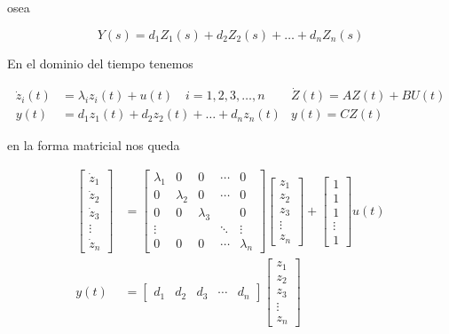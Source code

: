 \documentclass[legalpaper,twocolumn]{article}
\begin{document}
osea

\[Y(s) = d_1 Z_1(s) + d_2 Z_2(s) + \dots + d_n Z_n(s)\]

En el dominio del tiempo tenemos

\[
    \begin{aligned}
        \dot{z}_i(t) & = \lambda_i z_i(t) + u(t) \quad i = 1, 2, 3, \dots, n & \dot{Z}(t) = AZ(t) + B U(t) \\
        y(t)         & = d_1 z_1(t) + d_2 z_2(t) + \dots + d_n z_n(t)        & y(t) = C Z(t)
    \end{aligned}
\]

en la forma matricial nos queda

\[
    \begin{aligned}
        \begin{bmatrix}
            \dot{z}_1 \\
            \dot{z}_2 \\
            \dot{z}_3 \\
            \vdots    \\
            \dot{z}_n
        \end{bmatrix} & =
        \begin{bmatrix}
            \lambda_1 & 0         & 0         & \cdots & 0         \\
            0         & \lambda_2 & 0         & \cdots & 0         \\
            0         & 0         & \lambda_3 &        & 0         \\
            \vdots    &           &           & \ddots & \vdots    \\
            0         & 0         & 0         & \cdots & \lambda_n
        \end{bmatrix}
        \begin{bmatrix}
            z_1    \\
            z_2    \\
            z_3    \\
            \vdots \\
            z_n
        \end{bmatrix} +
        \begin{bmatrix}
            1      \\
            1      \\
            1      \\
            \vdots \\
            1
        \end{bmatrix} u(t)  \\
        y(t)            & =
        \begin{bmatrix}
            d_1 & d_2 & d_3 & \cdots & d_n
        \end{bmatrix}
        \begin{bmatrix}
            z_1    \\
            z_2    \\
            z_3    \\
            \vdots \\
            z_n
        \end{bmatrix}
    \end{aligned}
\]
\end{document}
